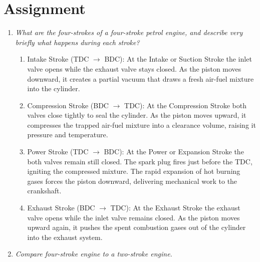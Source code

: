 \section{Assignment}

\begin{enumerate}
	\item \textit{What are the four-strokes of a four-stroke petrol engine, and describe very briefly what happens during each stroke?}

	      \begin{enumerate}
		      \item Intake Stroke (TDC $\rightarrow$ BDC): At the Intake or Suction Stroke the inlet valve opens while the exhaust valve stays closed. As the piston moves downward, it creates a partial vacuum that draws a fresh air-fuel mixture into the cylinder.
		      \item Compression Stroke (BDC $\rightarrow$ TDC): At the Compression Stroke both valves close tightly to seal the cylinder. As the piston moves upward, it compresses the trapped air-fuel mixture into a clearance volume, raising it pressure and temperature.
		      \item Power Stroke (TDC $\rightarrow$ BDC): At the Power or Expansion Stroke the both valves remain still closed. The spark plug fires just before the TDC, igniting the compressed mixture. The rapid expansion of hot burning gases forces the piston downward, delivering mechanical work to the crankshaft.
		      \item Exhaust Stroke (BDC $\rightarrow$ TDC): At the Exhaust Stroke the exhaust valve opens while the inlet valve remains closed. As the piston moves upward again, it pushes the spent combustion gases out of the cylinder into the exhaust system.
	      \end{enumerate}

	\item \textit{Compare four-stroke engine to a two-stroke engine.}


\end{enumerate}
